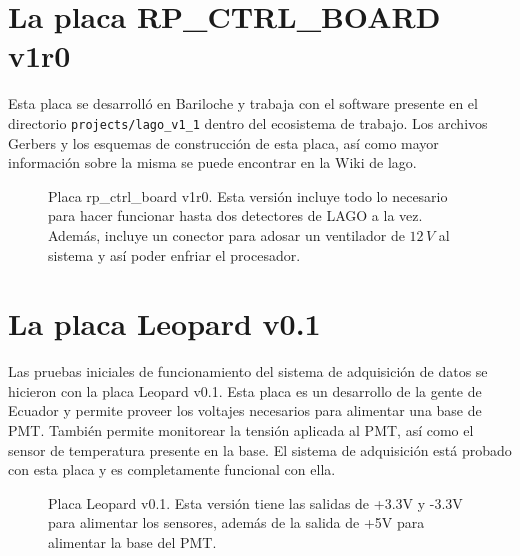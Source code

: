 \documentclass[a4paper,11pt]{article}
\begin{document}
\section{La placa RP\_CTRL\_BOARD v1r0}
Esta placa se desarrolló en Bariloche y trabaja con el software presente en el
directorio \texttt{projects/lago\_v1\_1} dentro del ecosistema de trabajo. Los
archivos Gerbers y los esquemas de construcción de esta placa, así como mayor
información sobre la misma se puede encontrar en la Wiki de lago.

\begin{figure}[!h]
  \centering
  \caption{Placa rp\_ctrl\_board v1r0. Esta versión incluye todo lo necesario
para hacer funcionar hasta dos detectores de LAGO a la vez. Además, incluye un
conector para adosar un ventilador de $12\,V$ al sistema y así poder enfriar el
procesador.}
  \label{fig:rp_ctrl_board_photo}
\end{figure}

\section{La placa Leopard v0.1}

Las pruebas iniciales de funcionamiento del sistema de adquisición de datos se
hicieron con la placa Leopard v0.1. Esta placa es un desarrollo de la gente de
Ecuador y permite proveer los voltajes necesarios para alimentar una base de
PMT. También permite monitorear la tensión aplicada al PMT, así como el sensor
de temperatura presente en la base. El sistema de adquisición está probado con
esta placa y es completamente funcional con ella.

\begin{figure}[!h]
  \centering
  \caption{Placa Leopard v0.1. Esta versión tiene las salidas de +3.3V y -3.3V
para alimentar los sensores, además de la salida de +5V para alimentar la base
del PMT.}
  \label{fig:leopard_photo}
\end{figure}
\end{document}

